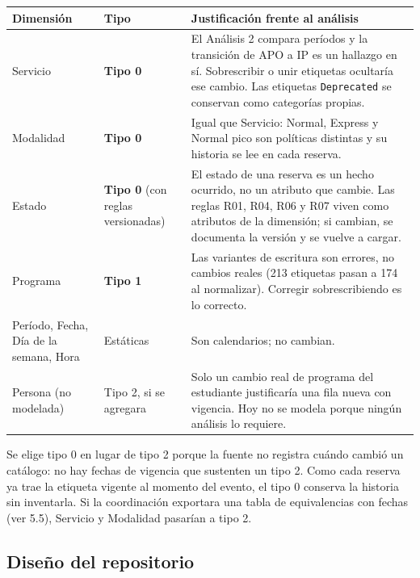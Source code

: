 \documentclass[11pt,letterpaper]{article}
\begin{document}
\begingroup\small\setlength{\tabcolsep}{4pt}\renewcommand{\arraystretch}{1.15}
\begin{longtable}{>{\raggedright\arraybackslash}p{}>{\raggedright\arraybackslash}p{}>{\raggedright\arraybackslash}p{}}
\toprule
\textbf{Dimensión} & \textbf{Tipo} & \textbf{Justificación frente al análisis} \\
\midrule
\endhead
Servicio & \textbf{Tipo 0} & El Análisis 2 compara períodos y la transición de APO a IP es un hallazgo en sí. Sobrescribir o unir etiquetas ocultaría ese cambio. Las etiquetas \texttt{Deprecated} se conservan como categorías propias. \\
Modalidad & \textbf{Tipo 0} & Igual que Servicio: Normal, Express y Normal pico son políticas distintas y su historia se lee en cada reserva. \\
Estado & \textbf{Tipo 0} (con reglas versionadas) & El estado de una reserva es un hecho ocurrido, no un atributo que cambie. Las reglas R01, R04, R06 y R07 viven como atributos de la dimensión; si cambian, se documenta la versión y se vuelve a cargar. \\
Programa & \textbf{Tipo 1} & Las variantes de escritura son errores, no cambios reales (213 etiquetas pasan a 174 al normalizar). Corregir sobrescribiendo es lo correcto. \\
Período, Fecha, Día de la semana, Hora & Estáticas & Son calendarios; no cambian. \\
Persona (no modelada) & Tipo 2, si se agregara & Solo un cambio real de programa del estudiante justificaría una fila nueva con vigencia. Hoy no se modela porque ningún análisis lo requiere. \\
\bottomrule
\end{longtable}
\endgroup


Se elige tipo 0 en lugar de tipo 2 porque la fuente no registra cuándo cambió un catálogo: no hay fechas de vigencia que sustenten un tipo 2. Como cada reserva ya trae la etiqueta vigente al momento del evento, el tipo 0 conserva la historia sin inventarla. Si la coordinación exportara una tabla de equivalencias con fechas (ver 5.5), Servicio y Modalidad pasarían a tipo 2.

\subsection{Diseño del repositorio}
\end{document}
